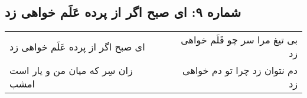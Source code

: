 \begin{center}
\section*{شماره ۹: ای صبح اگر از پرده عَلَم خواهی زد}
\label{sec:009}
\begin{longtable}{l p{0.5cm} r}
ای صبح اگر از پرده عَلَم خواهی زد
&&
بی تیغ مرا سر چو قَلَم خواهی زد
\\
زان سِر که میان من و یار است امشب
&&
دم نتوان زد چرا تو دم خواهی زد
\\
\end{longtable}
\end{center}
